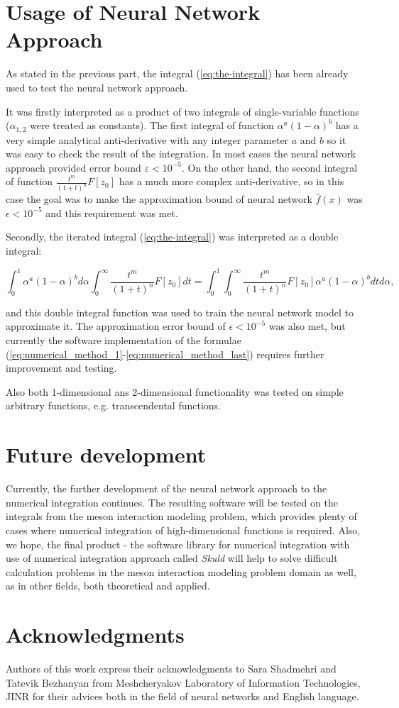 \documentclass[%
]{ittmm}
\begin{document}
\section{Usage of Neural Network Approach}

As stated in the previous part, the integral (\ref{eq:the-integral}) has been already used to test the neural network approach. 

It was firstly interpreted as a product of two integrals of single-variable functions ($\alpha_{1,2}$ were treated as constants). The first integral of function $\alpha^{a}(1 - \alpha)^b$ has a very simple analytical anti-derivative with any integer parameter $a$ and $b$ so it was easy to check the result of the integration. In most cases the neural network approach provided error bound $\varepsilon < 10^{-5}$. On the other hand, the second integral of function $\frac{t^m}{(1+t)^n}F[z_{0}]$ has a much more complex anti-derivative, so in this case the goal was to make the approximation bound of neural network $\hat{f}(x)$ was $\epsilon < 10^{-5}$ and this requirement was met.

Secondly, the iterated integral (\ref{eq:the-integral}) was interpreted as a double integral:

\begin{equation}
    \label{eq:iterated-as-double}
     \int_{0}^{1} \alpha^{a}(1 - \alpha)^bd\alpha \int_{0}^{\infty}\frac{t^m}{(1+t)^n}F[z_{0}]dt = 
     \int_{0}^{1} \int_{0}^{\infty}\frac{t^m}{(1+t)^n}F[z_{0}]\alpha^{a}(1 - \alpha)^bdtd\alpha ,
\end{equation}

\noindent and this double integral function was used to train the neural network model to approximate it. The approximation error bound of $\epsilon < 10^{-5}$ was also met, but currently the software implementation of the formulae (\ref{eq:numerical_method_1}-\ref{eq:numerical_method_last}) requires further improvement and testing.

Also both 1-dimensional ans 2-dimensional functionality was tested on simple arbitrary functions, e.g. transcendental functions.

\section{Future development}

Currently, the further development of the neural network approach to the numerical integration continues. The resulting software will be tested on the integrals from the meson interaction modeling problem, which provides plenty of cases where numerical integration of high-dimensional functions is required. Also, we hope, the final product - the software library for numerical integration with use of numerical integration approach called \textit{Skuld} will help to solve difficult calculation problems in the meson interaction modeling problem domain as well, as in other fields, both theoretical and applied.

\section{Acknowledgments}

Authors of this work express their acknowledgments to Sara Shadmehri and Tatevik Bezhanyan from Meshcheryakov Laboratory of Information Technologies, JINR for their advices both in the field of neural networks and English language.


\end{document}
